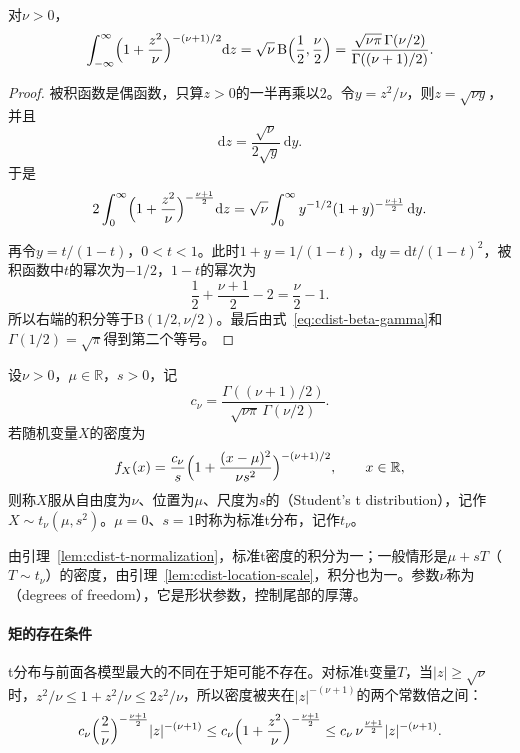 \begin{lemma}[t密度的归一化]
\label{lem:cdist-t-normalization}
对$\nu>0$，
\begin{equation}
  \int_{-\infty}^{\infty}\Bigl(1+\frac{z^{2}}{\nu}\Bigr)^{-(\nu+1)/2}\mathrm{d}z
  =\sqrt\nu\,\mathrm{B}\Bigl(\frac12,\frac\nu2\Bigr)
  =\frac{\sqrt{\nu\pi}\,\Gamma(\nu/2)}{\Gamma((\nu+1)/2)} .
  \label{eq:cdist-t-normalization}
\end{equation}
\end{lemma}

\begin{proof}
被积函数是偶函数，只算$z>0$的一半再乘以$2$。令$y=z^{2}/\nu$，则$z=\sqrt{\nu y}$，并且
\[
  \mathrm{d}z=\frac{\sqrt\nu}{2\sqrt y}\,\mathrm{d}y .
\]
于是
\[
  2\int_0^{\infty}\Bigl(1+\frac{z^{2}}{\nu}\Bigr)^{-\frac{\nu+1}{2}}\mathrm{d}z
  =\sqrt\nu\int_0^{\infty}y^{-1/2}(1+y)^{-\frac{\nu+1}{2}}\,\mathrm{d}y .
\]

再令$y=t/(1-t)$，$0<t<1$。此时$1+y=1/(1-t)$，$\mathrm{d}y=\mathrm{d}t/(1-t)^{2}$，被积函数中$t$的幂次为$-1/2$，$1-t$的幂次为
\[
  \frac12+\frac{\nu+1}{2}-2=\frac\nu2-1 .
\]
所以右端的积分等于$\mathrm{B}(1/2,\nu/2)$。最后由式~\eqref{eq:cdist-beta-gamma}和$\Gamma(1/2)=\sqrt\pi$得到第二个等号。
\end{proof}

\begin{definition}
\label{def:cdist-t}
设$\nu>0$，$\mu\in\mathbb{R}$，$s>0$，记
\begin{equation}
  c_\nu=\frac{\Gamma((\nu+1)/2)}{\sqrt{\nu\pi}\,\Gamma(\nu/2)} .
  \label{eq:cdist-t-constant}
\end{equation}
若随机变量$X$的密度为
\begin{equation}
  f_X(x)=\frac{c_\nu}{s}\Bigl(1+\frac{(x-\mu)^{2}}{\nu s^{2}}\Bigr)^{-(\nu+1)/2},\qquad x\in\mathbb{R},
  \label{eq:cdist-t-density}
\end{equation}
则称$X$服从自由度为$\nu$、位置为$\mu$、尺度为$s$的（Student's t distribution），记作$X\sim t_{\nu}(\mu,s^{2})$。$\mu=0$、$s=1$时称为标准t分布，记作$t_{\nu}$。
\end{definition}

由引理~\ref{lem:cdist-t-normalization}，标准t密度的积分为一；一般情形是$\mu+sT$（$T\sim t_\nu$）的密度，由引理~\ref{lem:cdist-location-scale}，积分也为一。参数$\nu$称为（degrees of freedom），它是形状参数，控制尾部的厚薄。

\paragraph{矩的存在条件}
t分布与前面各模型最大的不同在于矩可能不存在。对标准t变量$T$，当$\lvert z\rvert\geq\sqrt\nu$时，$z^{2}/\nu\leq1+z^{2}/\nu\leq2z^{2}/\nu$，所以密度被夹在$\lvert z\rvert^{-(\nu+1)}$的两个常数倍之间：
\[
  c_\nu\Bigl(\frac{2}{\nu}\Bigr)^{-\frac{\nu+1}{2}}\lvert z\rvert^{-(\nu+1)}
  \leq c_\nu\Bigl(1+\frac{z^{2}}{\nu}\Bigr)^{-\frac{\nu+1}{2}}
  \leq c_\nu\,\nu^{\frac{\nu+1}{2}}\lvert z\rvert^{-(\nu+1)}.
\]

